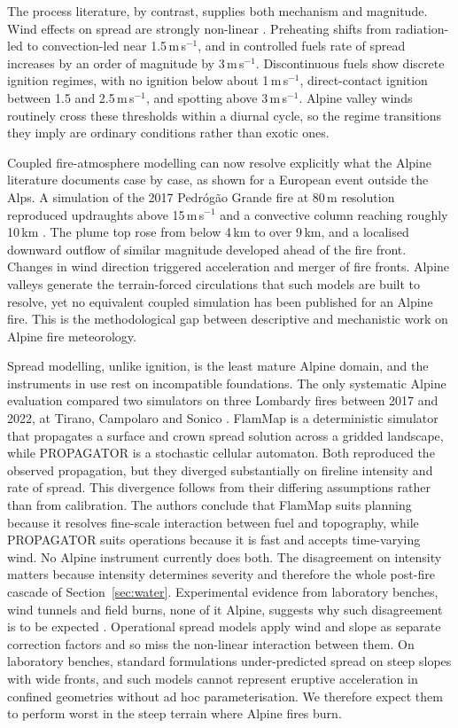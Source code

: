 \documentclass[11pt,a4paper]{article}
\begin{document}
The process literature, by contrast, supplies both mechanism and magnitude. Wind effects on spread are strongly non-linear \citep{hayajneh_wind_2026}. Preheating shifts from radiation-led to convection-led near 1.5\,m\,s$^{-1}$, and in controlled fuels rate of spread increases by an order of magnitude by 3\,m\,s$^{-1}$. Discontinuous fuels show discrete ignition regimes, with no ignition below about 1\,m\,s$^{-1}$, direct-contact ignition between 1.5 and 2.5\,m\,s$^{-1}$, and spotting above 3\,m\,s$^{-1}$. Alpine valley winds routinely cross these thresholds within a diurnal cycle, so the regime transitions they imply are ordinary conditions rather than exotic ones.

Coupled fire-atmosphere modelling can now resolve explicitly what the Alpine literature documents case by case, as shown for a European event outside the Alps. A simulation of the 2017 Pedr\'og\~ao Grande fire at 80\,m resolution reproduced updraughts above 15\,m\,s$^{-1}$ and a convective column reaching roughly 10\,km \citep{couto_numerical_2024}. The plume top rose from below 4\,km to over 9\,km, and a localised downward outflow of similar magnitude developed ahead of the fire front. Changes in wind direction triggered acceleration and merger of fire fronts. Alpine valleys generate the terrain-forced circulations that such models are built to resolve, yet no equivalent coupled simulation has been published for an Alpine fire. This is the methodological gap between descriptive and mechanistic work on Alpine fire meteorology.

Spread modelling, unlike ignition, is the least mature Alpine domain, and the instruments in use rest on incompatible foundations. The only systematic Alpine evaluation compared two simulators on three Lombardy fires between 2017 and 2022, at Tirano, Campolaro and Sonico \citep{malanchini_modeling_2025}. FlamMap is a deterministic simulator that propagates a surface and crown spread solution across a gridded landscape, while PROPAGATOR is a stochastic cellular automaton. Both reproduced the observed propagation, but they diverged substantially on fireline intensity and rate of spread. This divergence follows from their differing assumptions rather than from calibration. The authors conclude that FlamMap suits planning because it resolves fine-scale interaction between fuel and topography, while PROPAGATOR suits operations because it is fast and accepts time-varying wind. No Alpine instrument currently does both. The disagreement on intensity matters because intensity determines severity and therefore the whole post-fire cascade of Section~\ref{sec:water}. Experimental evidence from laboratory benches, wind tunnels and field burns, none of it Alpine, suggests why such disagreement is to be expected \citep{hayajneh_wind_2026}. Operational spread models apply wind and slope as separate correction factors and so miss the non-linear interaction between them. On laboratory benches, standard formulations under-predicted spread on steep slopes with wide fronts, and such models cannot represent eruptive acceleration in confined geometries without ad hoc parameterisation. We therefore expect them to perform worst in the steep terrain where Alpine fires burn.
\end{document}
